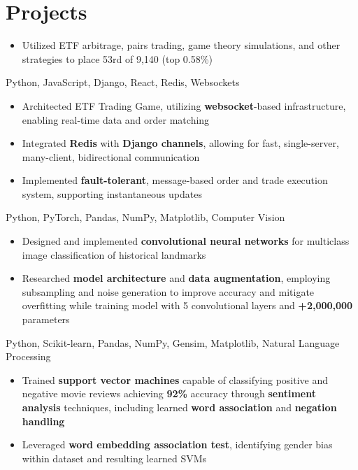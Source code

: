 \documentclass[letterpaper,11pt]{article}
\begin{document}
\section{Projects}
\begin{itemize}
    \item Utilized ETF arbitrage, pairs trading, game theory simulations, and
        other strategies to place 53rd of 9,140 (top 0.58\%)
\end{itemize}
{Python, JavaScript, Django, React, Redis, Websockets}{}
\begin{itemize}
    \item Architected ETF Trading Game, utilizing \textbf{websocket}-based
        infrastructure, enabling real-time data and order matching
    \item Integrated \textbf{Redis} with \textbf{Django channels},
        allowing for fast, single-server, many-client, bidirectional
        communication
    \item Implemented \textbf{fault-tolerant}, message-based order
        and trade execution system, supporting instantaneous updates
\end{itemize}
{Python, PyTorch, Pandas, NumPy, Matplotlib, Computer Vision}{}
\begin{itemize}
    \item Designed and implemented \textbf{convolutional neural networks} for multiclass
        image classification of historical landmarks
    \item Researched \textbf{model architecture} and \textbf{data augmentation},
        employing subsampling and noise generation to improve accuracy and mitigate
        overfitting while training model with 5 convolutional layers and
        \textbf{+2,000,000} parameters
\end{itemize}
{Python, Scikit-learn, Pandas, NumPy, Gensim, Matplotlib, Natural Language Processing}{}
\begin{itemize}
    \item Trained \textbf{support vector machines} capable of classifying positive and
        negative movie reviews achieving \textbf{92\%} accuracy through
        \textbf{sentiment analysis} techniques, including learned \textbf{word
        association} and \textbf{negation handling}
    \item Leveraged \textbf{word embedding association test}, identifying
        gender bias within dataset and resulting learned SVMs
\end{itemize}
\end{document}
